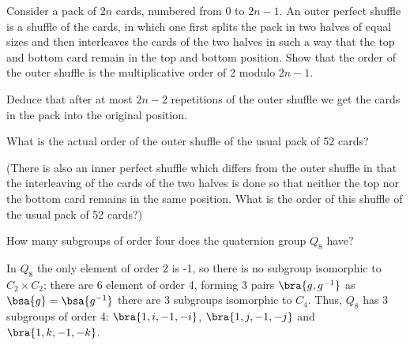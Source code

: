 

\begin{problem}
Consider a pack of $2n$ cards, numbered from 0 to $2n-1$. An outer perfect shuffle is a shuffle of the cards,
in which one first splits the pack in two halves of equal sizes and then interleaves the cards of the two halves in such a way that the top and bottom card remain in the top and bottom position. Show that the order of the outer shuffle is the multiplicative order of 2 modulo $2n - 1$. 

Deduce that after at most $2n - 2$ repetitions of the outer shuffle we get the cards in the pack into the original position.

What is the actual order of the outer shuffle of the usual pack of 52 cards?

(There is also an inner perfect shuffle which differs from the outer shuffle in that the interleaving of the cards of the two halves is done so that neither the top nor the bottom card remains in the same position. What is the order of this shuffle of the usual pack of 52 cards?)
\end{problem}


\begin{solution}[\bf Solution.]

\end{solution}


\begin{problem}
How many subgroups of order four does the quaternion group $Q_8$ have?
\end{problem}

\begin{solution}[\bf Solution.]
In $Q_8$ the only element of order 2 is -1, so there is no subgroup isomorphic to $C_2\times C_2$; there are 6 element of order 4, forming 3 pairs $\bra{g,g^{-1}}$ as $\bsa{g} = \bsa{g^{-1}}$ there are 3 subgroups isomorphic to $C_4$. Thus, $Q_8$ has 3 subgroups of order 4: $\bra{1,i,-1,-i}$, $\bra{1,j,-1,-j}$ and $\bra{1,k,-1,-k}$.
\end{solution}



